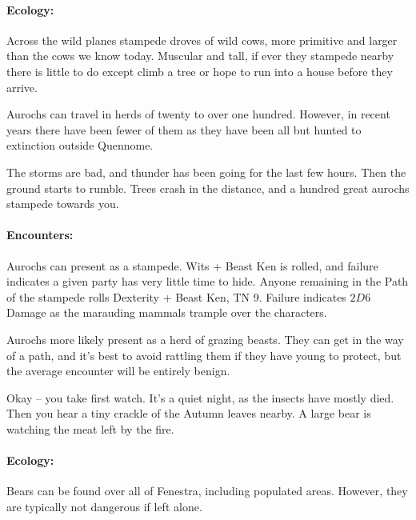\label{auroch}

\auroch

\paragraph{Ecology:} Across the wild planes stampede droves of wild cows, more primitive and larger than the cows we know today.  Muscular and tall, if ever they stampede nearby there is little to do except climb a tree or hope to run into a house before they arrive.

	Aurochs can travel in herds of twenty to over one hundred.  However, in recent years there have been fewer of them as they have been all but hunted to extinction outside Quennome.


\begin{boxtext}

	The storms are bad, and thunder has been going for the last few hours.  Then the ground starts to rumble.  Trees crash in the distance, and a hundred great aurochs stampede towards you.

\end{boxtext}

\paragraph{Encounters:} Aurochs can present as a stampede.  Wits + Beast Ken is rolled, and failure indicates a given party has very little time to hide.  Anyone remaining in the Path of the stampede rolls Dexterity + Beast Ken, TN 9.  Failure indicates $2D6$ Damage as the marauding mammals trample over the characters.

Aurochs more likely present as a herd of grazing beasts.  They can get in the way of a path, and it's best to avoid rattling them if they have young to protect, but the average encounter will be entirely benign.

\label{bear}

\bear

\begin{boxtext}

	Okay -- you take first watch.  It's a quiet night, as the insects have mostly died.  Then you hear a tiny crackle of the Autumn leaves nearby.  A large bear is watching the meat left by the fire.

\end{boxtext}

\paragraph{Ecology:} Bears can be found over all of Fenestra, including populated areas.  However, they are typically not dangerous if left alone.

